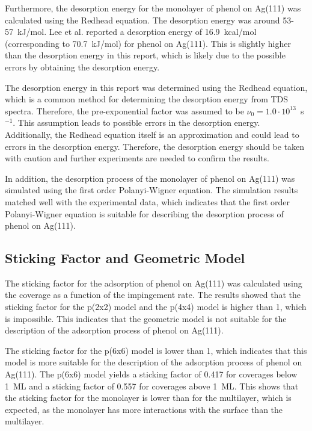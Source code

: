 \documentclass[fontsize=11pt,reqno,a4paper,oneside]{scrartcl}
\begin{document}
Furthermore, the desorption energy for the monolayer of phenol on Ag(111) was calculated using the Redhead equation.\autocite{Redhead1962} The desorption energy was around 53-57~kJ/mol. Lee et al.\autocite{Lee2001} reported a desorption energy of 16.9~kcal/mol (corresponding to 70.7~kJ/mol) for phenol on Ag(111). This is slightly higher than the desorption energy in this report, which is likely due to the possible errors by obtaining the desorption energy.

The desorption energy in this report was determined using the Redhead equation\autocite{Redhead1962}, which is a common method for determining the desorption energy from \ac{TDS} spectra. Therefore, the pre-exponential factor was assumed to be $\nu_0 = 1.0 \cdot 10^{13}$~s$^{-1}$. This assumption leads to possible errors in the desorption energy. Additionally, the Redhead equation itself is an approximation and could lead to errors in the desorption energy. Therefore, the desorption energy should be taken with caution and further experiments are needed to confirm the results.

In addition, the desorption process of the monolayer of phenol on Ag(111) was simulated using the first order Polanyi-Wigner equation. The simulation results matched well with the experimental data, which indicates that the first order Polanyi-Wigner equation is suitable for describing the desorption process of phenol on Ag(111).


\subsection{Sticking Factor and Geometric Model}

The sticking factor for the adsorption of phenol on Ag(111) was calculated using the coverage as a function of the impingement rate. The results showed that the sticking factor for the p(2x2) model and the p(4x4) model is higher than 1, which is impossible. This indicates that the geometric model is not suitable for the description of the adsorption process of phenol on Ag(111).

The sticking factor for the p(6x6) model is lower than 1, which indicates that this model is more suitable for the description of the adsorption process of phenol on Ag(111). The p(6x6) model yields a sticking factor of 0.417 for coverages below 1~ML and a sticking factor of 0.557 for coverages above 1~ML. This shows that the sticking factor for the monolayer is lower than for the multilayer, which is expected, as the monolayer has more interactions with the surface than the multilayer.
\end{document}
